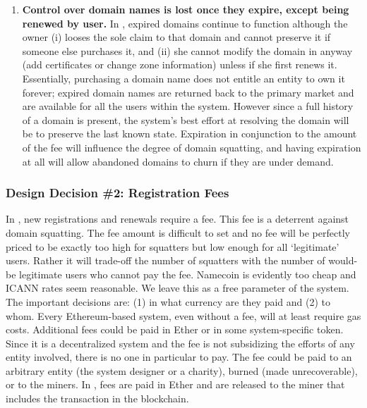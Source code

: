 \begin{enumerate}
\item \textbf{Control over domain names is lost once they expire, except being renewed by user.} In \Ghazalstar, expired domains continue to function although the owner (i) looses the sole claim to that domain and cannot preserve it if someone else purchases it, and (ii) she cannot modify the domain in anyway (\eg add certificates or change zone information) unless if she first renews it. Essentially, purchasing a domain name does not entitle an entity to own it forever; expired domain names are returned back to the primary market and are available for all the users within the system. However since a full history of a domain is present, the system's best effort at resolving the domain will be to preserve the last known state. Expiration in conjunction to the amount of the fee will influence the degree of domain squatting, and having expiration at all will allow abandoned domains to churn if they are under demand. 

\end {enumerate}
\subsubsection[Registration Fees]{Design Decision \#2: Registration Fees}

In \Ghazalstar, new registrations and renewals require a fee. This fee is a deterrent against domain squatting. The fee amount is difficult to set and no fee will be perfectly priced to be exactly too high for squatters but low enough for all `legitimate' users. Rather it will trade-off the number of squatters with the number of would-be legitimate users who cannot pay the fee. Namecoin is evidently too cheap and ICANN rates seem reasonable. We leave this as a free parameter of the system. The important decisions are: (1) in what currency are they paid and (2) to whom. Every Ethereum-based system, even without a fee, will at least require gas costs. Additional fees could be paid in Ether or in some system-specific token. Since it is a decentralized system and the fee is not subsidizing the efforts of any entity involved, there is no one in particular to pay. The fee could be paid to an arbitrary entity (the system designer or a charity), burned (made unrecoverable), or to the miners. In \Ghazalstar, fees are paid in Ether and are released to the miner that includes the transaction in the blockchain. 

